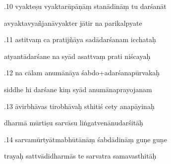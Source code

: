 \documentclass[article,12pt,a4paper]{memoir}%
\newcounter{parCount}
\begin{document}
	  
	  \pstart {}.10 vyakteṣu vyaktarūpāṇāṃ stanādīnāṃ tu darśanāt 
	{}
	\pend%
      

	  
	  \pstart \leavevmode%
	avyaktavyañjanāvyakter jātir na parikalpyate 
	{}
	\pend%
      

	  
	  \pstart {}.11 astitvaṃ ca pratijñāya sadādarśanam icchataḥ 
	{}
	\pend%
      

	  
	  \pstart \leavevmode%
	atyantādarśane na syād asattvaṃ prati niścayaḥ 
	{}
	\pend%
      

	  
	  \pstart {}.12 na cālam anumānāya śabdo+adarśanapūrvakaḥ 
	{}
	\pend%
      

	  
	  \pstart \leavevmode%
	siddhe hi darśane kiṃ syād anumānaprayojanam 
	{}
	\pend%
      

	  
	  \pstart {}.13 āvirbhāvas tirobhāvaḥ sthitiś cety anapāyinaḥ 
	{}
	\pend%
      

	  
	  \pstart \leavevmode%
	dharmā mūrtiṣu sarvāsu liṅgatvenānudarśitāḥ 
	{}
	\pend%
      

	  
	  \pstart {}.14 sarvamūrtyātmabhūtānāṃ śabdādināṃ guṇe guṇe 
	{}
	\pend%
      

	  
	  \pstart \leavevmode%
	trayaḥ sattvādidharmās te sarvatra samavasthitāḥ 
	{}
	\pend%
      
\end{document}
